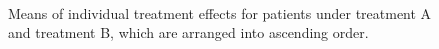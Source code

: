 	\begin{figure}[ht!]
		\begin{center}
			\\
		\end{center}
		\caption{Means of individual treatment effects for patients under treatment A and treatment B, which are arranged into ascending order.}
		\label{fig4_4}
	\end{figure}
	
